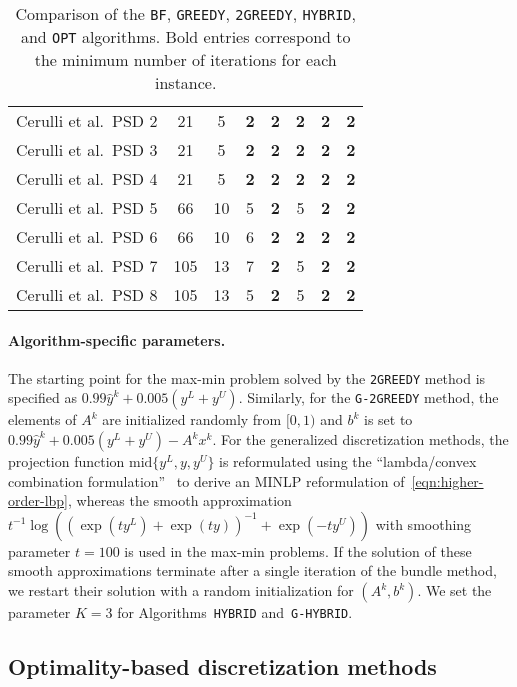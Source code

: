 \documentclass{article}
\newcommand{\1}[1]{\mathds{1}\left[#1\right]}
\begin{document}
\begin{table}[t]
\begin{tabular}{rccccccc}
Cerulli et al.\ PSD 2 &	21 &	5 &	\textbf{2} &	\textbf{2} &	\textbf{2} &	\textbf{2} &	\textbf{2} \\
Cerulli et al.\ PSD 3 &	21 &	5 &	\textbf{2} &	\textbf{2} &	\textbf{2} &	\textbf{2} &	\textbf{2} \\
Cerulli et al.\ PSD 4 &	21 &	5 &	\textbf{2} &	\textbf{2} &	\textbf{2} &	\textbf{2} &	\textbf{2} \\
Cerulli et al.\ PSD 5 &	66 &	10 &	5 &	\textbf{2} &	5 &	\textbf{2} &	\textbf{2} \\
Cerulli et al.\ PSD 6 &	66 &	10 &	6 &	\textbf{2} &	\textbf{2} &	\textbf{2}&	\textbf{2} \\
Cerulli et al.\ PSD 7 &	105 &	13 &	7 &	\textbf{2} &	5 &	\textbf{2} &	\textbf{2} \\
Cerulli et al.\ PSD 8 &	105 &	13 &	5 &	\textbf{2} &	5 &	\textbf{2} &	\textbf{2} \\
\hline
\end{tabular}
\caption{
Comparison of the \texttt{BF}, \texttt{GREEDY}, \texttt{2GREEDY}, \texttt{HYBRID}, and \texttt{OPT} algorithms. 
Bold entries correspond to the minimum number of iterations for each instance.
}
\label{tab:resul-simple-probs}
\end{table}



\paragraph*{Algorithm-specific parameters.}
The starting point for the max-min problem solved by the \texttt{2GREEDY} method is specified as $0.99 \hat{y}^k + 0.005 (y^L + y^U)$. Similarly, for the \texttt{G-2GREEDY} method, the elements of $A^k$ are initialized randomly from $[0,1)$ and $b^k$ is set to \mbox{$0.99 \hat{y}^k + 0.005 (y^L + y^U) - A^kx^k$}. 
For the generalized discretization methods, the projection function $\text{mid}\{y^L, y, y^U\}$ is reformulated using the ``lambda/convex combination formulation''~\cite{vielma2015mixed} to derive an MINLP reformulation of~\eqref{eqn:higher-order-lbp}, whereas the smooth approximation \mbox{$t^{-1}\log((\exp(ty^L)+\exp(ty))^{-1}+\exp(-ty^U))$} with smoothing parameter $t = 100$ is used in the max-min problems. 
If the solution of these smooth approximations terminate after a single iteration of the bundle method, we restart their solution with a random initialization for $(A^k, b^k)$.
We set the parameter $K = 3$ for Algorithms~\texttt{HYBRID} and~\texttt{G-HYBRID}.


\subsection{Optimality-based discretization methods}
\label{sec: disc-methods}
\end{document}

